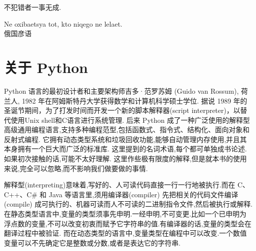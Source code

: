 \documentclass[main.tex]{subfiles}
\begin{document}
\begin{flushright}
	\begin{kaishu}
		不犯错者一事无成.\\
	\end{kaishu}
{\selectfont Ne oxibaet{}s{ya} tot, kto niqego ne lelaet.}\\
俄国彦语
\end{flushright}

\section{关于 Python}\label{ch3.1}

Python 语言的最初设计者和主要架构师吉多·范罗苏姆 (Guido van Rossum), 荷兰人, 1982 年在阿姆斯特丹大学获得数学和计算机科学硕士学位.
据说 1989 年的圣诞节期间，为了打发时间而开发一个新的脚本解释器(script interpreter)，以替代使用Unix shell和C语言进行系统管理.
后来 Python 成了一种广泛使用的解释型高级通用编程语言,支持多种编程范型,包括函数式、指令式、结构化、面向对象和反射式编程.
它拥有动态类型系统和垃圾回收功能,能够自动管理内存使用,并且其本身拥有一个巨大而广泛的标准库.
这里提到的名词术语,每个都可单独成书论述.如果初次接触的话,可能不太好理解.
这里作些极有限度的解释,但是就本书的使用来说,完全可以忽略,而不影响我们做要做的事情.

解释型(interpreting)意味着,写好的、人可读代码直接一行一行地被执行.而在 C、C++、C\# 和 Java 等语言里,须用编译器(compiler) 先把相关的代码文件编译(compile)
成可执行的、机器可读而人不可读的二进制指令文件,然后被执行或解释.在静态类型语言中,变量的类型须事先申明.一经申明,不可变更.比如一个已申明为浮点数的变量,不可以改变初衷而赋予它字符串的值.有编译器的话,变量的类型会在翻译过程中被验证.
而在动态类型的语言中,变量类型在编程中可以改变.一个数值变量可以不先确定它是整数或分数,或者是表达它的字符串.
\end{document}
